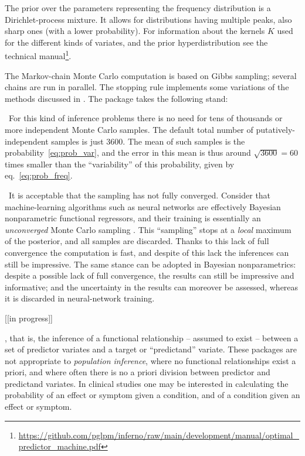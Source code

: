 The prior over the parameters representing the frequency distribution is a  Dirichlet-process mixture. It allows for distributions having multiple peaks, also sharp ones (with a lower probability). For information about the kernels $K$ used for the different kinds of variates, and the prior hyperdistribution see the technical manual\footnote{\url{https://github.com/pglpm/inferno/raw/main/development/manual/optimal_predictor_machine.pdf}}.

\medskip

The Markov-chain Monte Carlo computation is based on Gibbs sampling; several chains are run in parallel. The stopping rule implements some variations of the methods discussed in \cite{vehtarietal2021}. The package takes the following stand:

\textbullet\ For this kind of inference problems there is no need for tens of thousands or more independent Monte Carlo samples. The default total number of putatively-independent samples is just 3600. The mean of such samples is the probability~\eqref{eq:prob_var}, and the error in this mean is thus around $\sqrt{3600} = 60$ times smaller than the ``variability'' of this probability, given by eq.~\eqref{eq:prob_freq}.

\textbullet\ It is acceptable that the sampling has not fully converged. Consider that machine-learning algorithms such as neural networks are effectively Bayesian nonparametric functional regressors, and their training is essentially an \emph{unconverged} Monte Carlo sampling \citep{mackay1992,gal2016,mandtetal2017,huszar2017}. This ``sampling'' stops at a \emph{local} maximum of the posterior, and all samples are discarded. Thanks to this lack of full convergence the computation is fast, and despite of this lack the inferences can still be impressive. The same stance can be adopted in Bayesian nonparametrics: despite a possible lack of full convergence, the results can still be impressive and informative; and the uncertainty in the results can moreover be assessed, whereas it is discarded in neural-network training.




[[in progress]]

%




{\small

}


, that is, the inference of a functional relationship -- assumed to exist -- between a set of predictor variates and a target or ``predictand'' variate. These packages are not appropriate to \emph{population inference}, where no functional relationships exist a priori, and where often there is no a priori division between predictor and predictand variates. In clinical studies one may be interested in calculating the probability of an effect or symptom given a condition, and of a condition given an effect or symptom.
